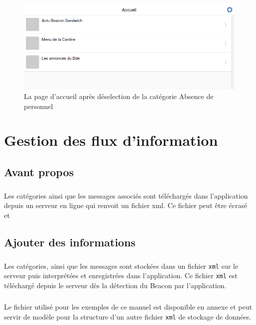 \documentclass{report}
\begin{document}
\begin{figure}[h]
	\centering
	\includegraphics[scale=0.28]{accueilPerso.png}
	\caption{La page d'accueil après déselection de la catégorie \og Absence de personnel \fg}
\end{figure}

\chapter{Gestion des flux d'information}

\section{Avant propos}
\paragraph{}
Les catégories ainsi que les messages associés sont téléchargés dans l'application depuis un serveur en ligne qui renvoit un fichier xml. Ce fichier peut être écrasé et 

\section{Ajouter des informations}
\paragraph{}
Les catégories, ainsi que les messages sont stockées dans un fichier \texttt{xml} sur le serveur puis interprétées et enregistrées dans l'application.
Ce fichier \texttt{xml} est téléchargé depuis le serveur dès la détection du Beacon par l'application.

\paragraph{}
Le fichier utilisé pour les exemples de ce manuel est disponible en annexe et peut servir de modèle pour la structure d'un autre fichier \texttt{xml} de stockage de données.
\end{document}
